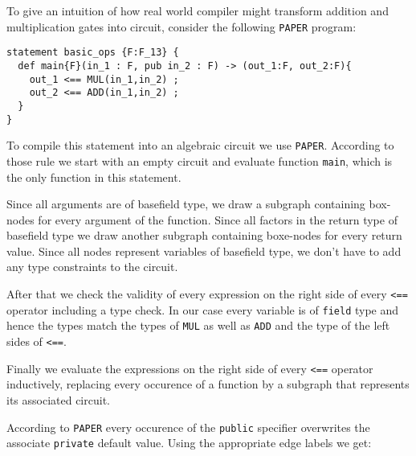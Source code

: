 \begin{example} To give an intuition of how real world compiler might transform addition and multiplication gates into circuit, consider the following \texttt{PAPER} program:
\begin{lstlisting}
statement basic_ops {F:F_13} {
  def main{F}(in_1 : F, pub in_2 : F) -> (out_1:F, out_2:F){
    out_1 <== MUL(in_1,in_2) ;
    out_2 <== ADD(in_1,in_2) ;
  }
}
\end{lstlisting} 
To compile this statement into an algebraic circuit we use \texttt{PAPER}. According to those rule we start with an empty circuit and evaluate function \texttt{main}, which is the only function in this statement. 

Since all arguments are of basefield type, we draw a subgraph containing box-nodes for every argument of the function. Since all factors in the return type of basefield type we draw another subgraph containing boxe-nodes for every return value. Since all nodes represent variables of basefield type, we don't have to add any type constraints to the circuit.

After that we check the validity of every expression on the right side of every \texttt{<==} operator including a type check. In our case every variable is of \texttt{field} type and hence the types match the types of \texttt{MUL} as well as \texttt{ADD} and the type of the left sides of \texttt{<==}. 

Finally we evaluate the expressions on the right side of every \texttt{<==} operator inductively, replacing every occurence of a function by a subgraph that represents its associated circuit.

According to \texttt{PAPER} every occurence of the \texttt{public} specifier overwrites the associate \texttt{private} default value. Using the appropriate edge labels we get: 
\begin{center}
\end{center}
\end{example}
